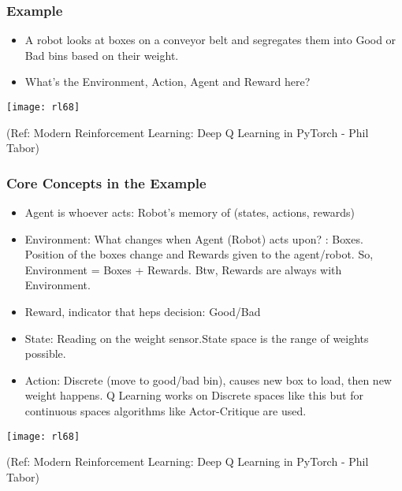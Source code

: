 \begin{frame}[fragile]\frametitle{Example}


\begin{itemize}
\item A robot looks at boxes on a conveyor belt and segregates them into Good or Bad bins based on their weight.
\item What's the Environment, Action, Agent and Reward here?

\end{itemize}

\begin{center}
\texttt{[image: rl68]}
\end{center}

{\tiny (Ref: Modern Reinforcement Learning: Deep Q Learning in PyTorch - Phil Tabor)}

\end{frame}

\begin{frame}[fragile]\frametitle{Core Concepts in the Example}


\begin{itemize}
\item Agent is whoever acts: Robot's memory of (states, actions, rewards)
\item Environment: What changes when Agent (Robot) acts upon? : Boxes. Position of the boxes change and Rewards given to the agent/robot. So, Environment = Boxes + Rewards. Btw, Rewards are always with Environment.
\item Reward, indicator that heps decision: Good/Bad
\item State: Reading on the weight sensor.State space is the range of weights possible.
\item Action: Discrete (move to good/bad bin), causes new box to load, then new weight happens. Q Learning works on Discrete spaces like this but for continuous spaces algorithms like Actor-Critique are used.
\end{itemize}

\begin{center}
\texttt{[image: rl68]}
\end{center}

{\tiny (Ref: Modern Reinforcement Learning: Deep Q Learning in PyTorch - Phil Tabor)}

\end{frame}

